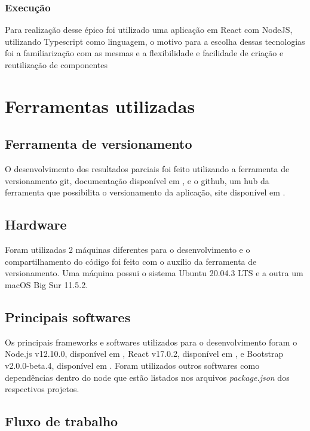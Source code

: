 \subsubsection{Execução}

Para realização desse épico foi utilizado uma aplicação em React com NodeJS, utilizando Typescript 
como linguagem, o motivo para a escolha dessas tecnologias foi a familiarização com as mesmas e a 
flexibilidade e facilidade de criação e reutilização de componentes

\section{Ferramentas utilizadas}

\subsection{Ferramenta de versionamento}

O desenvolvimento dos resultados parciais foi feito utilizando a ferramenta de versionamento git,
 documentação disponível em \cite{doc:git}, e o github, um hub da ferramenta que possibilita o 
 versionamento da aplicação, site disponível em \cite{github}.

\subsection{Hardware}

Foram utilizadas 2 máquinas diferentes para o desenvolvimento e o compartilhamento do código foi 
feito com o auxílio da ferramenta de versionamento. Uma máquina possui o sistema Ubuntu 20.04.3 LTS 
e a outra um macOS Big Sur 11.5.2.

\subsection{Principais softwares}

Os principais frameworks e softwares utilizados para o desenvolvimento foram o Node.js v12.10.0, 
disponível em \cite{nodejs},  React v17.0.2, disponível em \cite{react}, e Bootstrap v2.0.0-beta.4, 
disponível em \cite{react:bootstrap}. Foram utilizados outros softwares como dependências dentro do 
node que estão listados nos arquivos \textit{package.json} dos respectivos projetos.

\subsection{Fluxo de trabalho}

